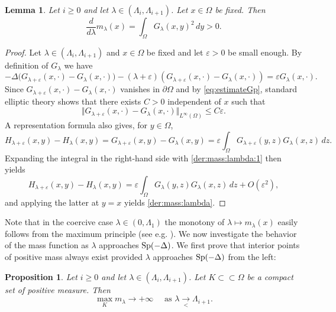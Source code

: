 \documentclass[10pt]{amsart}
\numberwithin{equation}{section}
\newcommand{\Sp}{{\rm Sp}}
\newcommand{\ve}{\varepsilon}
\newcommand{\Om}{\Omega}
\theoremstyle{plain}
\newtheorem{prop}{Proposition}[section]%
\newtheorem{lemme}{Lemma}[section]%
\theoremstyle{remark}
\begin{document}
\begin{lemme}
Let $i \ge 0$ and let $\lambda \in (\Lambda_i, \Lambda_{i+1})$. Let $x \in \Om$ be fixed. Then 
\begin{equation} \label{der:mass:lambda}
\frac{d}{d \lambda} m_{\lambda}(x) = \int_{\Om} G_\lambda(x, y)^2 \, dy >0.
\end{equation}
\end{lemme}

\begin{proof}
Let $\lambda \in (\Lambda_i, \Lambda_{i+1})$ and $x \in \Om$ be fixed and let $\ve >0$ be small enough. By definition of $G_\lambda$ we have 
$$  - \Delta \big(  G_{\lambda+\ve}(x, \cdot) - G_\lambda(x, \cdot) \big) - (\lambda + \ve)(G_{\lambda+\ve}(x, \cdot)- G_\lambda(x, \cdot)) = \ve G_\lambda(x,\cdot). $$
Since $G_{\lambda+\ve}(x, \cdot) - G_\lambda(x, \cdot)$ vanishes in $\partial \Om$ and by \eqref{eq:estimateGp}, standard elliptic theory shows that there exists $C >0$ independent of $x$ such that  
\begin{equation} \label{der:mass:lambda:1}
\Vert  G_{\lambda+\ve}(x, \cdot) - G_\lambda(x, \cdot) \Vert_{L^\infty(\Om)} \le C\ve.
\end{equation}
A representation formula also gives, for $y \in \Om$,  
$$ H_{\lambda+\ve}(x,y) - H_\lambda(x,y) = G_{\lambda+\ve}(x,y) - G_\lambda(x, y) = \ve \int_{\Om}G_{\lambda+\ve}(y, z)G_\lambda(x,z) \, dz .$$
Expanding the integral in the right-hand side with \eqref{der:mass:lambda:1} then yields 
$$ H_{\lambda+\ve}(x,y) - H_\lambda(x,y) = \ve \int_{\Om}G_{\lambda}(y, z)G_\lambda(x,z) \, dz + O(\ve^2), $$
and applying the latter at $y=x$ yields \eqref{der:mass:lambda}.
\end{proof}
Note that in the coercive case $\lambda \in (0, \Lambda_1)$ the monotony of $\lambda \mapsto m_\lambda(x)$ easily follows from the maximum principle (see e.g. \cite{DelPinoDolbeaultMusso}). We now investigate the behavior of the mass function as $\lambda$ approaches $\Sp(-\Delta)$. We first prove that interior points of positive mass always exist provided $\lambda$ approaches $\Sp(-\Delta)$ from the left: 



\begin{prop} \label{prop:massepositive}
Let $i \ge 0$ and let $\lambda \in (\Lambda_i, \Lambda_{i+1})$. Let $K \subset \subset \Om$ be a compact set of positive measure. Then  
$$ \max_{K} m_\lambda \to + \infty \quad \text{ as } \lambda \underset{< }{\to} \Lambda_{i+1} . $$
\end{prop}
\end{document}
